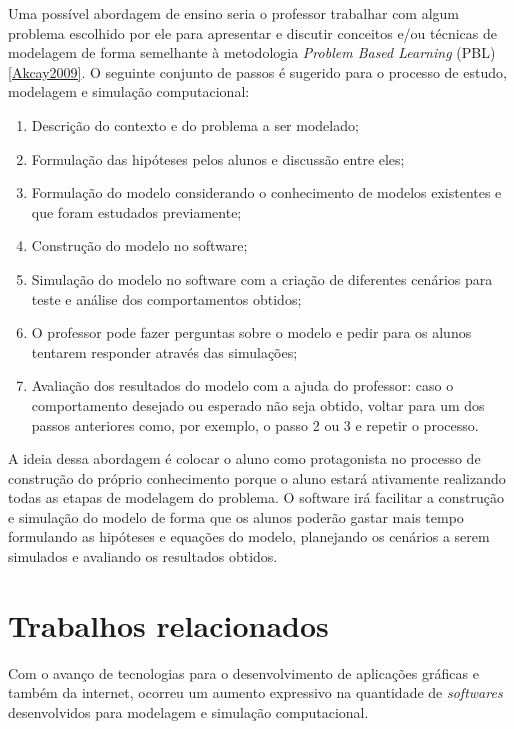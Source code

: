 \documentclass[
	12pt,				%
	openright,			%
	oneside,			%
	a4paper,			%
	main=brazil,
	english,			%
	]{ufsj-abntex2}
\begin{document}
Uma possível abordagem de ensino seria o professor trabalhar com algum problema escolhido por ele para apresentar e discutir conceitos e/ou técnicas de modelagem de forma semelhante à metodologia \textit{Problem Based Learning} (PBL) \ref{Akcay2009}. O seguinte conjunto de passos é sugerido para o processo de estudo, modelagem e simulação computacional: 

\begin{enumerate}
 \item Descrição do contexto e do problema a ser modelado;
 \item Formulação das hipóteses pelos alunos e discussão entre eles;
 \item Formulação do modelo considerando o conhecimento de modelos existentes e que foram estudados previamente;
 \item Construção do modelo no software;
 \item Simulação do modelo no software com a criação de diferentes cenários para teste e análise dos comportamentos obtidos;
 \item O professor pode fazer perguntas sobre o modelo e pedir para os alunos tentarem responder através das simulações; 
 \item Avaliação dos resultados do modelo com a ajuda do professor: caso o comportamento desejado ou esperado não seja obtido, voltar para um dos passos anteriores como, por exemplo, o passo 2 ou 3 e repetir o processo. 
\end{enumerate}

A ideia dessa abordagem é colocar o aluno como protagonista no processo de construção do próprio conhecimento porque o aluno estará ativamente realizando todas as etapas de modelagem do problema. O software irá facilitar a construção e simulação do modelo de forma que os alunos poderão gastar mais tempo formulando as hipóteses e equações do modelo, planejando os cenários a serem simulados e avaliando os resultados obtidos. 

\chapter{Trabalhos relacionados}
\label{chap:relacionados}

Com o avanço de tecnologias para o desenvolvimento de aplicações gráficas e também da internet, ocorreu um aumento expressivo na quantidade de \textit{softwares} desenvolvidos para modelagem e simulação computacional. 
\end{document}
